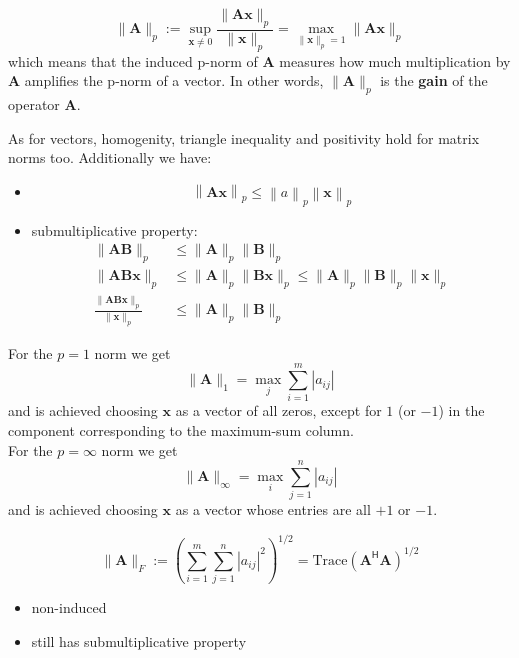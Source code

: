 \begin{equation*}
    \|\mathbf{A}\|_p:=\sup_{\mathbf{x}\neq0}\frac{\|\mathbf{Ax}\|_p}{\|\mathbf{x}\|_p}=\max_{\|\mathbf{x}\|_p=1}\|\mathbf{Ax}\|_p
\end{equation*}
which means that the induced p-norm of $\mathbf{A}$ measures how much multiplication by $\mathbf{A}$ amplifies the p-norm of a vector. In other words, $\|\mathbf{A}\|_p$ is the \textbf{gain} of the operator $\mathbf{A}$.

\newpar{}

As for vectors, homogenity, triangle inequality and positivity hold for matrix norms too. Additionally we have:
\begin{itemize}
    \item
          \noindent\begin{equation*}
              \left\|\mathbf{Ax}\right\|_p\leq\left\|a\right\|_p\left\|\mathbf{x}\right\|_p
          \end{equation*}
    \item submultiplicative property:
          \begin{align*}
              \|\mathbf{AB}\|_p                                     & \leq\|\mathbf{A}\|_p\|\mathbf{B}\|_p                                                      \\
              \|\mathbf{AB} \mathbf{x}\|_p                          & \leq\|\mathbf{A}\|_p\|\mathbf{Bx}\|_p\leq\|\mathbf{A}\|_p\|\mathbf{B}\|_p\|\mathbf{x}\|_p \\
              \frac{\|\mathbf{AB} \mathbf{x}\|_p}{\|\mathbf{x}\|_p} & \leq\|\mathbf{A}\|_p\|\mathbf{B}\|_p
          \end{align*}
\end{itemize}


For the $p = 1$ norm we get
\begin{equation*}
    \|\mathbf{A}\|_1=\max_j\sum_{i=1}^m|a_{ij}|
\end{equation*}
and is achieved choosing $\mathbf{x}$ as a vector of all zeros, except for $1$ (or $-1$) in the component corresponding to the maximum-sum column.\\

For the $p = \infty$ norm we get
\begin{equation*}
    \|\mathbf{A}\|_\infty=\max_i\sum_{j=1}^n|a_{ij}|
\end{equation*}
and is achieved choosing $\mathbf{x}$ as a vector whose entries are all $+1$ or $-1$.


\begin{equation*}
    \|\mathbf{A}\|_F:={\left(\sum_{i=1}^m\sum_{j=1}^n|a_{ij}|^2\right)}^{1/2}=\text{Trace}{(\mathbf{A}^{\mathsf{H}}\mathbf{A})}^{1/2}
\end{equation*}

\begin{itemize}
    \item non-induced
    \item still has submultiplicative property
\end{itemize}
